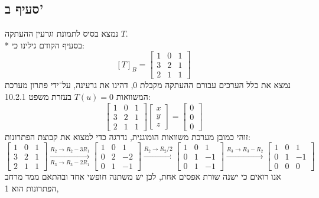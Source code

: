 \documentclass[a4paper,10pt]{article}
\begin{document}
\begin{hebrew}
	\subsection{סעיף ב'}
	נמצא בסיס לתמונת וגרעין ההעתקה $T$. \\*
	בסעיף הקודם גילינו כי:
	\[
		{[T]}_B =
		\begin{bmatrix}
			1 & 0 & 1 \\
			3 & 2 & 1 \\
			2 & 1 & 1
		\end{bmatrix}
	\]
	נמצא את כלל הערכים עבורם ההעתקה מקבלת $0$, דהינו את גרעינה,
	על־ידי פתרון מערכת המשוואות $T(u) = 0$ בעזרת משפט 10.2.1:
	\[
		\begin{bmatrix}
			1 & 0 & 1 \\
			3 & 2 & 1 \\
			2 & 1 & 1
		\end{bmatrix}
		\begin{bmatrix} x \\ y \\ z \end{bmatrix}
		=
		\begin{bmatrix} 0 \\ 0 \\ 0 \end{bmatrix}
	\]
	זוהי כמובן מערכת משוואות הומוגנית, נדרגה כדי למצוא את קבוצת הפתרונות:
	\[
		\begin{bmatrix}
			1 & 0 & 1 \\
			3 & 2 & 1 \\
			2 & 1 & 1
		\end{bmatrix}
		\xrightarrow[R_3 \rightarrow R_3 - 2R_1]{R_2 \rightarrow R_2 - 3R_1}
		\begin{bmatrix}
			1 & 0 & 1 \\
			0 & 2 & -2 \\
			0 & 1 & -1
		\end{bmatrix}
		\xrightarrow{R_2 \rightarrow R_2 / 2}
		\begin{bmatrix}
			1 & 0 & 1 \\
			0 & 1 & -1 \\
			0 & 1 & -1
		\end{bmatrix}
		\xrightarrow{R_3 \rightarrow R_3 - R_2}
		\begin{bmatrix}
			1 & 0 & 1 \\
			0 & 1 & -1 \\
			0 & 0 & 0
		\end{bmatrix}
	\]
	אנו רואים כי ישנה שורת אפסים אחת,
	לכן יש משתנה חופשי אחד ובהתאם ממד מרחב הפתרונות הוא 1,

\end{hebrew}
\end{document}
